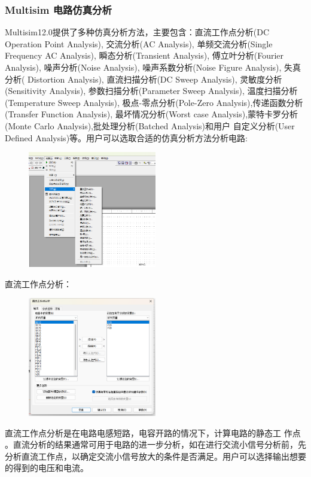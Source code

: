 \documentclass[a4paper,11pt,UTF8]{article}
\numberwithin{equation}{subsection}
\begin{document}
\subsubsection{Multisim 电路仿真分析 }
Multisim12.0提供了多种仿真分析方法，主要包含：直流工作点分析(DC Operation Point Analysis), 交流分析(AC Analysis), 单频交流分析(Single Frequency AC Analysis), 瞬态分析(Transient Analysis), 傅立叶分析(Fourier Analysis), 噪声分析(Noise Analysis), 噪声系数分析(Noise Figure Analysis), 失真分析( Distortion Analysis), 直流扫描分析(DC Sweep Analysis), 灵敏度分析(Sensitivity Analysis), 参数扫描分析(Parameter Sweep Analysis), 温度扫描分析(Temperature Sweep Analysis), 极点-零点分析(Pole-Zero Analysis),传递函数分析(Transfer Function Analysis), 最坏情况分析(Worst case Analysis),蒙特卡罗分析(Monte Carlo Analysis),批处理分析(Batched Analysis)和用户 自定义分析(User Defined Analysis)等。用户可以选取合适的仿真分析方法分析电路:
\begin{figure}[H]
	\centering
	\includegraphics[width=0.5\textwidth]{5.2.3_1}	
\end{figure}

直流工作点分析：
\begin{figure}[H]
	\centering
	\includegraphics[width=0.5\textwidth]{5.2.3_2}	
\end{figure}

直流工作点分析是在电路电感短路，电容开路的情况下，计算电路的静态工
作点 。直流分析的结果通常可用于电路的进一步分析，如在进行交流小信号分析前，先分析直流工作点，以确定交流小信号放大的条件是否满足。用户可以选择输出想要的得到的电压和电流。
\end{document}

